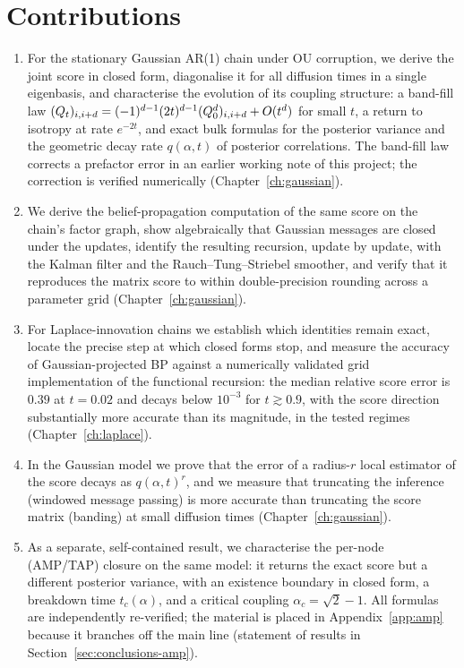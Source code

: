 \section{Contributions}

\begin{enumerate}
  \item For the stationary Gaussian AR(1) chain under OU corruption, we
  derive the joint score in closed form, diagonalise it for all
  diffusion times in a single eigenbasis, and characterise the evolution
  of its coupling structure: a band-fill law
  $(Q_t)_{i,i+d} = (-1)^{d-1}(2t)^{d-1}(Q_0^d)_{i,i+d} + O(t^d)$ for
  small $t$, a return to isotropy at rate $e^{-2t}$, and exact bulk
  formulas for the posterior variance and the geometric decay rate
  $q(\alpha, t)$ of posterior correlations. The band-fill law corrects a
  prefactor error in an earlier working note of this project; the
  correction is verified numerically (Chapter~\ref{ch:gaussian}).

  \item We derive the belief-propagation computation of the same score
  on the chain's factor graph, show algebraically that Gaussian messages
  are closed under the updates, identify the resulting recursion, update
  by update, with the Kalman filter and the Rauch--Tung--Striebel
  smoother, and verify that it reproduces the matrix score to within
  double-precision rounding across a parameter grid
  (Chapter~\ref{ch:gaussian}).

  \item For Laplace-innovation chains we establish which identities
  remain exact, locate the precise step at which closed forms stop, and
  measure the accuracy of Gaussian-projected BP against a numerically
  validated grid implementation of the functional recursion: the median
  relative score error is $0.39$ at $t = 0.02$ and decays below
  $10^{-3}$ for $t \gtrsim 0.9$, with the score direction substantially
  more accurate than its magnitude, in the tested regimes
  (Chapter~\ref{ch:laplace}).

  \item In the Gaussian model we prove that the error of a radius-$r$
  local estimator of the score decays as $q(\alpha,t)^r$, and we measure
  that truncating the inference (windowed message passing) is more
  accurate than truncating the score matrix (banding) at small diffusion
  times (Chapter~\ref{ch:gaussian}).

  \item As a separate, self-contained result, we characterise the
  per-node (AMP/TAP) closure on the same model: it returns the exact
  score but a different posterior variance, with an existence boundary
  in closed form, a breakdown time $t_c(\alpha)$, and a critical
  coupling $\alpha_c = \sqrt{2} - 1$. All formulas are independently
  re-verified; the material is placed in Appendix~\ref{app:amp} because
  it branches off the main line (statement of results in
  Section~\ref{sec:conclusions-amp}).
\end{enumerate}

